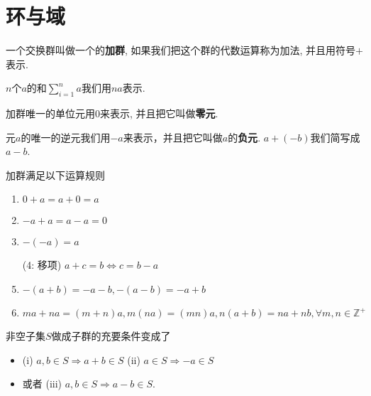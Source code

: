 \section{环与域}

\begin{Definition}[加群]
一个交换群叫做一个的\textbf{加群}, 如果我们把这个群的代数运算称为加法, 并且用符号$+$表示.
\end{Definition}

\begin{Definition}[$\Sigma$]
{
}
\end{Definition}

\begin{Definition}
$n$个$a$的和$\displaystyle \sum_{i=1}^{n} a$我们用$na$表示.
\end{Definition}

\begin{Definition}[零元]
加群唯一的单位元用$\mathfrak{0}$来表示, 并且把它叫做\textbf{零元}.
\end{Definition}

\begin{Definition}[负元]
元$a$的唯一的逆元我们用$-a$来表示，并且把它叫做$a$的\textbf{负元}. $a + (-b)$我们简写成$a - b$.
\end{Definition}

\begin{Theorem}
加群满足以下运算规则
\begin{enumerate}[(1)]
\item $\mathfrak{0} + a = a + \mathfrak{0} = a$
\item $-a + a = a - a = \mathfrak{0}$
\item $-(-a) = a$
\item[(4: 移项)] $a + c = b \Leftrightarrow c = b - a$
\item $-(a +b) = -a - b, -(a-b) = -a +b$
\item $ma + na = (m+n)a, m(na) = (mn)a, n(a+b) = na + nb, \forall m, n \in \mathbb{Z}^+$
\end{enumerate}
\end{Theorem}

\begin{Note}
非空子集$S$做成子群的充要条件变成了 
\begin{itemize}
\item (i) $a, b \in S \Rightarrow a+b \in S$ (ii) $a \in S \Rightarrow -a \in S$
\item 或者 (iii) $a, b \in S \Rightarrow a - b \in S$.
\end{itemize}
\end{Note}

